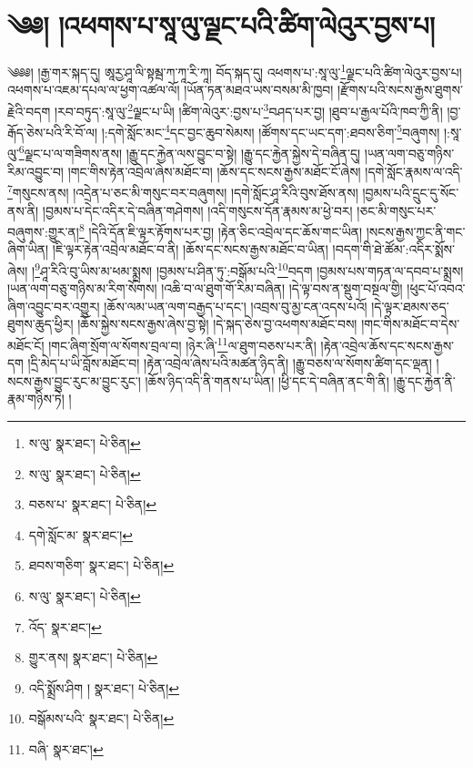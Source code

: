 \setcounter{footnote}{0} 
\chapter{༄༅། །འཕགས་པ་སཱ་ལུ་ལྗང་པའི་ཚིག་ལེའུར་བྱས་པ།}༄༅༅། །རྒྱ་གར་སྐད་དུ། ཨཱརྱ་ཤཱ་ལི་སྟམྦ་ཀ་ཀཱ་རི་ཀཱ། བོད་སྐད་དུ། འཕགས་པ་:སཱ་ལུ་\footnote{ས་ལུ་  སྣར་ཐང་།  པེ་ཅིན། }ལྗང་པའི་ཚིག་ལེའུར་བྱས་པ། འཕགས་པ་འཇམ་དཔལ་ལ་ཕྱག་འཚལ་ལོ། །ཡོན་ཏན་མཐའ་ཡས་བསམ་མི་ཁྱབ། །རྫོགས་པའི་སངས་རྒྱས་ཐུགས་རྗེའི་བདག །རབ་བཏུད་:སཱ་ལུ་\footnote{ས་ལུ་  སྣར་ཐང་།  པེ་ཅིན། }ལྗང་པ་ཡི། །ཚིག་ལེའུར་:བྱས་པ་\footnote{བཅས་པ་  སྣར་ཐང་།  པེ་ཅིན། }བཤད་པར་བྱ། །ཐུབ་པ་རྒྱལ་པོའི་ཁབ་ཀྱི་ནི། །བྱ་རྒོད་ཅེས་པའི་རི་བོ་ལ། །:དགེ་སློང་མང་\footnote{དགེ་སློང་མ་  སྣར་ཐང་། }དང་བྱང་ཆུབ་སེམས། །ཚོགས་དང་ཡང་དག་:ཐབས་ཅིག་\footnote{ཐབས་གཅིག་  སྣར་ཐང་།  པེ་ཅིན། }བཞུགས། །:སཱ་ལུ་\footnote{ས་ལུ་  སྣར་ཐང་།  པེ་ཅིན། }ལྗང་པ་ལ་གཟིགས་ནས། །རྒྱུ་དང་རྐྱེན་ལས་བྱུང་བ་སྟེ། །རྒྱུ་དང་རྐྱེན་སྐྱེས་དེ་བཞིན་དུ། །ཡན་ལག་བཅུ་གཉིས་རིམ་འབྱུང་བ། །གང་གིས་རྟེན་འབྲེལ་ཞེས་མཐོང་བ། །ཆོས་དང་སངས་རྒྱས་མཐོང་ངོ་ཞེས། །དགེ་སློང་རྣམས་ལ་འདི་\footnote{འོད་  སྣར་ཐང་། }གསུངས་ནས། །འདྲེན་པ་ཅང་མི་གསུང་བར་བཞུགས། །དགེ་སློང་ཤཱ་རིའི་བུས་ཐོས་ནས། །བྱམས་པའི་དྲུང་དུ་སོང་ནས་ནི། །བྱམས་པ་དེང་འདིར་དེ་བཞིན་གཤེགས། །འདི་གསུངས་དོན་རྣམས་མ་ཕྱེ་བར། །ཅང་མི་གསུང་པར་བཞུགས་:གྱུར་ན།\footnote{གྱུར་ནས།  སྣར་ཐང་།  པེ་ཅིན། } །དེའི་དོན་ཇི་ལྟར་རྟོགས་པར་བྱ། །རྟེན་ཅིང་འབྲེལ་དང་ཆོས་གང་ཡིན། །སངས་རྒྱས་ཀྱང་ནི་གང་ཞིག་ཡིན། །ཇི་ལྟར་རྟེན་འབྲེལ་མཐོང་བ་ནི། །ཆོས་དང་སངས་རྒྱས་མཐོང་བ་ཡིན། །བདག་གི་ཐེ་ཚོམ་:འདིར་སྨོས་ཞེས། །\footnote{འདི་སྨྲོས་ཤིག །  སྣར་ཐང་།  པེ་ཅིན། }ཤཱ་རིའི་བུ་ཡིས་མ་ཕམ་སྨྲས། །བྱམས་པ་ཤིན་ཏུ་:བསྒོམ་པའི་\footnote{བསྒོམས་པའི་  སྣར་ཐང་།  པེ་ཅིན། }བདག །བྱམས་པས་གཏན་ལ་དབབ་པ་སྨྲས། །ཡན་ལག་བཅུ་གཉིས་མ་རིག་སོགས། །འཆི་བ་ལ་ཐུག་གོ་རིམ་བཞིན། །དེ་ལྟ་བས་ན་སྡུག་བསྔལ་གྱི། །ཕུང་པོ་འབའ་ཞིག་འབྱུང་བར་འགྱུར། །ཆོས་ལམ་ཡན་ལག་བརྒྱད་པ་དང་། །འབྲས་བུ་མྱ་ངན་འདས་པའོ། །དེ་ལྟར་ཐམས་ཅད་ཐུགས་ཆུད་ཕྱིར། །ཆོས་སྐྱེས་སངས་རྒྱས་ཞེས་བྱ་སྟེ། །དེ་སྐད་ཅེས་བྱ་འཕགས་མཐོང་བས། །གང་གིས་མཐོང་བ་དེས་མཐོང་ངོ། །གང་ཞིག་སྲོག་ལ་སོགས་བྲལ་བ། །ཉེར་ཞི་\footnote{བཞི་  སྣར་ཐང་། }ལ་ཐུག་བཅས་པར་ནི། །རྟེན་འབྲེལ་ཆོས་དང་སངས་རྒྱས་དག །དྲི་མེད་པ་ཡི་བློས་མཐོང་བ། །རྟེན་འབྲེལ་ཞེས་པའི་མཚན་ཉིད་ནི། །རྒྱུ་བཅས་ལ་སོགས་ཚིག་དང་ལྡན། །སངས་རྒྱས་བྱུང་རུང་མ་བྱུང་རུང་། །ཆོས་ཉིད་འདི་ནི་གནས་པ་ཡིན། །ཕྱི་དང་དེ་བཞིན་ནང་གི་ནི། །རྒྱུ་དང་རྐྱེན་ནི་རྣམ་གཉིས་ཏེ། །
